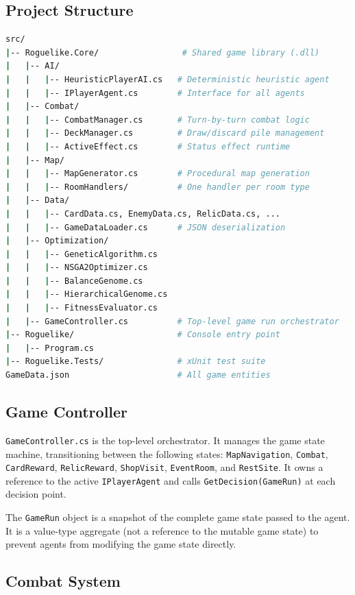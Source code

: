 \subsection{Project Structure}

\begin{lstlisting}[language=bash, caption={C\# project structure}]
src/
|-- Roguelike.Core/                 # Shared game library (.dll)
|   |-- AI/
|   |   |-- HeuristicPlayerAI.cs   # Deterministic heuristic agent
|   |   |-- IPlayerAgent.cs        # Interface for all agents
|   |-- Combat/
|   |   |-- CombatManager.cs       # Turn-by-turn combat logic
|   |   |-- DeckManager.cs         # Draw/discard pile management
|   |   |-- ActiveEffect.cs        # Status effect runtime
|   |-- Map/
|   |   |-- MapGenerator.cs        # Procedural map generation
|   |   |-- RoomHandlers/          # One handler per room type
|   |-- Data/
|   |   |-- CardData.cs, EnemyData.cs, RelicData.cs, ...
|   |   |-- GameDataLoader.cs      # JSON deserialization
|   |-- Optimization/
|   |   |-- GeneticAlgorithm.cs
|   |   |-- NSGA2Optimizer.cs
|   |   |-- BalanceGenome.cs
|   |   |-- HierarchicalGenome.cs
|   |   |-- FitnessEvaluator.cs
|   |-- GameController.cs          # Top-level game run orchestrator
|-- Roguelike/                     # Console entry point
|   |-- Program.cs
|-- Roguelike.Tests/               # xUnit test suite
GameData.json                      # All game entities
\end{lstlisting}

\subsection{Game Controller}

\texttt{GameController.cs} is the top-level orchestrator. It manages the game state machine, transitioning between the following states: \texttt{MapNavigation}, \texttt{Combat}, \texttt{CardReward}, \texttt{RelicReward}, \texttt{ShopVisit}, \texttt{EventRoom}, and \texttt{RestSite}. It owns a reference to the active \texttt{IPlayerAgent} and calls \texttt{GetDecision(GameRun)} at each decision point.

The \texttt{GameRun} object is a snapshot of the complete game state passed to the agent. It is a value-type aggregate (not a reference to the mutable game state) to prevent agents from modifying the game state directly.

\subsection{Combat System}

